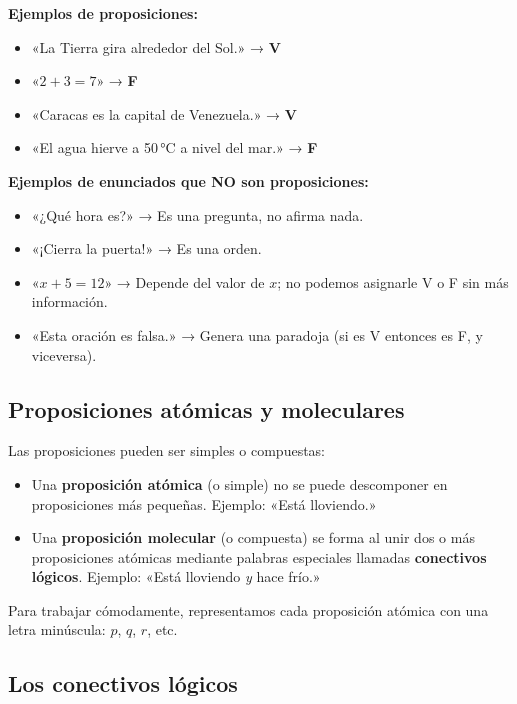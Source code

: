 \documentclass[12pt, letterpaper]{article}
\begin{document}
\noindent\textbf{Ejemplos de proposiciones:}
\begin{itemize}[leftmargin=*]
  \item «La Tierra gira alrededor del Sol.» → \textbf{V}
  \item «$2 + 3 = 7$» → \textbf{F}
  \item «Caracas es la capital de Venezuela.» → \textbf{V}
  \item «El agua hierve a 50\,°C a nivel del mar.» → \textbf{F}
\end{itemize}

\noindent\textbf{Ejemplos de enunciados que NO son proposiciones:}
\begin{itemize}[leftmargin=*]
  \item «¿Qué hora es?» → Es una pregunta, no afirma nada.
  \item «¡Cierra la puerta!» → Es una orden.
  \item «$x + 5 = 12$» → Depende del valor de $x$; no podemos asignarle V o F sin más información.
  \item «Esta oración es falsa.» → Genera una paradoja (si es V entonces es F, y viceversa).
\end{itemize}

\subsection{Proposiciones atómicas y moleculares}

Las proposiciones pueden ser simples o compuestas:

\begin{itemize}[leftmargin=*]
  \item Una \textbf{proposición atómica} (o simple) no se puede descomponer en proposiciones más pequeñas. Ejemplo: «Está lloviendo.»
  \item Una \textbf{proposición molecular} (o compuesta) se forma al unir dos o más proposiciones atómicas mediante palabras especiales llamadas \textbf{conectivos lógicos}. Ejemplo: «Está lloviendo \emph{y} hace frío.»
\end{itemize}

Para trabajar cómodamente, representamos cada proposición atómica con una letra minúscula: $p$, $q$, $r$, etc.

\subsection{Los conectivos lógicos}
\end{document}
